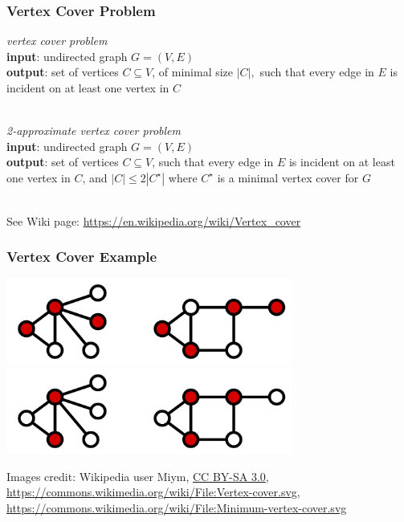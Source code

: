\documentclass{beamer}
\newcommand{\stanza}{ \\~\ }
\begin{document}
\begin{frame} \frametitle{Vertex Cover Problem}
\emph{vertex cover problem} \\
\textbf{input}: undirected graph $G=(V,E)$ \\
\textbf{output}: set of vertices $C \subseteq V$, of minimal size $|C|,$ such
  that every edge in $E$ is incident on at least one vertex in $C$
 \stanza

 \emph{2-approximate vertex cover problem} \\
 \textbf{input}: undirected graph $G=(V,E)$ \\
 \textbf{output}: set of vertices $C \subseteq V$, such
   that every edge in $E$ is incident on at least one vertex in $C$, and
   $|C| \leq 2 |C^\star|$ where $C^\star$ is a minimal vertex cover for $G$
  \stanza

See Wiki page: \url{https://en.wikipedia.org/wiki/Vertex_cover}
\end{frame}

\begin{frame} \frametitle{Vertex Cover Example}
  \begin{center}
    \includegraphics[height=80pt]{13-vertex-cover-1.png}
    \includegraphics[height=80pt]{13-vertex-cover-2.png}
  \end{center}

  {\tiny
  Images credit: Wikipedia user Miym,
  \href{https://creativecommons.org/licenses/by-sa/3.0)}{CC BY-SA 3.0},
  \url{https://commons.wikimedia.org/wiki/File:Vertex-cover.svg},
  \url{https://commons.wikimedia.org/wiki/File:Minimum-vertex-cover.svg}
  }
\end{frame}
\end{document}
